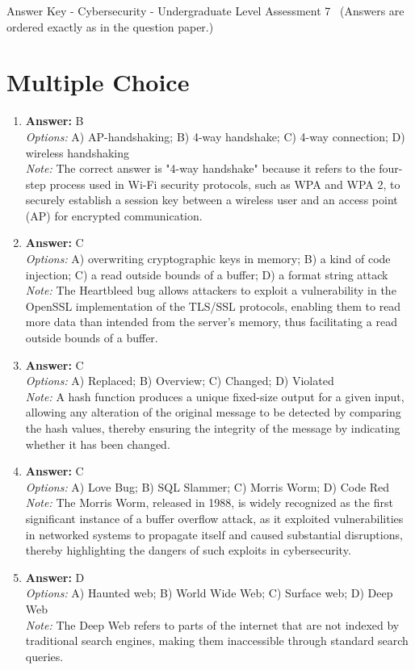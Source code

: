 \documentclass[12pt]{article}
\begin{document}
\begin{center}
Answer Key - Cybersecurity - Undergraduate Level Assessment 7 \
\small (Answers are ordered exactly as in the question paper.)
\end{center}

\section*{Multiple Choice}
\begin{enumerate}[label=\arabic*.]
\item \textbf{Answer:} B
\\ \textit{Options:} A) AP-handshaking; B) 4-way handshake; C) 4-way connection; D) wireless handshaking
\\ \textit{Note:} The correct answer is "4-way handshake" because it refers to the four-step process used in Wi-Fi security protocols, such as WPA and WPA 2, to securely establish a session key between a wireless user and an access point (AP) for encrypted communication.
\item \textbf{Answer:} C
\\ \textit{Options:} A) overwriting cryptographic keys in memory; B) a kind of code injection; C) a read outside bounds of a buffer; D) a format string attack
\\ \textit{Note:} The Heartbleed bug allows attackers to exploit a vulnerability in the OpenSSL implementation of the TLS/SSL protocols, enabling them to read more data than intended from the server's memory, thus facilitating a read outside bounds of a buffer.
\item \textbf{Answer:} C
\\ \textit{Options:} A) Replaced; B) Overview; C) Changed; D) Violated
\\ \textit{Note:} A hash function produces a unique fixed-size output for a given input, allowing any alteration of the original message to be detected by comparing the hash values, thereby ensuring the integrity of the message by indicating whether it has been changed.
\item \textbf{Answer:} C
\\ \textit{Options:} A) Love Bug; B) SQL Slammer; C) Morris Worm; D) Code Red
\\ \textit{Note:} The Morris Worm, released in 1988, is widely recognized as the first significant instance of a buffer overflow attack, as it exploited vulnerabilities in networked systems to propagate itself and caused substantial disruptions, thereby highlighting the dangers of such exploits in cybersecurity.
\item \textbf{Answer:} D
\\ \textit{Options:} A) Haunted web; B) World Wide Web; C) Surface web; D) Deep Web
\\ \textit{Note:} The Deep Web refers to parts of the internet that are not indexed by traditional search engines, making them inaccessible through standard search queries.
\end{enumerate}
\end{document}
